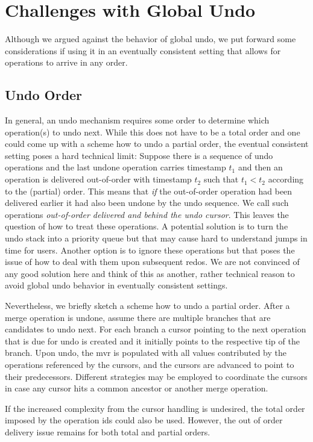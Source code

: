 \documentclass[sigplan,natbib=false,review]{acmart}
\begin{document}
\section{Challenges with Global Undo}

Although we argued against the behavior of global undo, we put forward
some considerations if using it in an eventually consistent setting that
allows for operations to arrive in any order.

\subsection{Undo Order}

In general, an undo mechanism requires some order to determine which
operation(s) to undo next. 
While this does not have to be a total order and
one could come up with a scheme how to undo a partial order,
the eventual consistent setting poses a hard technical limit:
Suppose there is a sequence of undo operations and the last undone operation
carries timestamp $t_1$ and then an operation is delivered out-of-order with
timestamp $t_2$ such that $t_1 < t_2$ according to the (partial) order.
This means that \emph{if} the out-of-order operation had been delivered earlier it
had also been undone by the undo sequence.
We call such operations \emph{out-of-order delivered and behind the undo cursor}.
This leaves the question of how to treat these operations.
A potential solution is to turn the undo stack into a priority queue but
that may cause hard to understand jumps in time for users.
Another option is to ignore these operations but that poses the issue of
how to deal with them upon subsequent redos.
We are not convinced of any good solution here and think of this as another,
rather technical reason to avoid global undo behavior in eventually consistent
settings.

Nevertheless, we briefly sketch a scheme how to undo a partial order.
After a merge operation is undone, assume there are multiple branches
that are candidates to undo next.
For each branch a cursor pointing to the next operation that is due for undo
is created and it initially points to the respective tip of the branch.
Upon undo, the \gls{mvr} is populated with all values contributed by the
operations referenced by the cursors, and the cursors are advanced
to point to their predecessors.
Different strategies may be employed to coordinate the cursors in case
any cursor hits a common ancestor or another merge operation.

If the increased complexity from the cursor handling is undesired,
the total order imposed by the operation ids could also be used.
However, the out of order delivery issue remains for both total and
partial orders.
\end{document}
